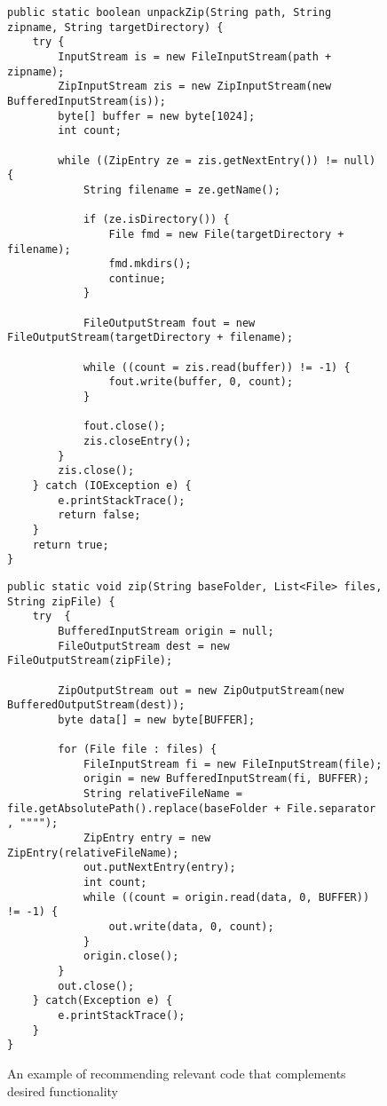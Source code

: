 \begin{figure*}[!t]
\begin{minipage}[t]{0.5\linewidth}
\begin{lstlisting}[style=MyJavaSmallStyle, caption={Query code: unpacking a zip file}, label={lst:mot-query}]
public static boolean unpackZip(String path, String zipname, String targetDirectory) {
	try {
		InputStream is = new FileInputStream(path + zipname);
		ZipInputStream zis = new ZipInputStream(new BufferedInputStream(is));
		byte[] buffer = new byte[1024];
		int count;

		while ((ZipEntry ze = zis.getNextEntry()) != null) {
			String filename = ze.getName();

			if (ze.isDirectory()) {
				File fmd = new File(targetDirectory + filename);
				fmd.mkdirs();
				continue;
			}

			FileOutputStream fout = new FileOutputStream(targetDirectory + filename);

			while ((count = zis.read(buffer)) != -1) {
				fout.write(buffer, 0, count);
			}

			fout.close();
			zis.closeEntry();
		}
		zis.close();
	} catch (IOException e) {
		e.printStackTrace();
		return false;
	}
	return true;
}
\end{lstlisting}
\end{minipage}
%
\begin{minipage}[t]{0.5\linewidth}
\begin{lstlisting}[style=MyJavaSmallStyle, caption={Recommended related code: zipping a file}, label={lst:mot-related}]
public static void zip(String baseFolder, List<File> files, String zipFile) {
	try  {
		BufferedInputStream origin = null;
		FileOutputStream dest = new FileOutputStream(zipFile);

		ZipOutputStream out = new ZipOutputStream(new BufferedOutputStream(dest));
		byte data[] = new byte[BUFFER];

		for (File file : files) {
			FileInputStream fi = new FileInputStream(file);
			origin = new BufferedInputStream(fi, BUFFER);
			String relativeFileName = file.getAbsolutePath().replace(baseFolder + File.separator , """");
			ZipEntry entry = new ZipEntry(relativeFileName);
			out.putNextEntry(entry);
			int count;
			while ((count = origin.read(data, 0, BUFFER)) != -1) {
				out.write(data, 0, count);
			}
			origin.close();
		}
		out.close();
	} catch(Exception e) {
		e.printStackTrace();
	}
}
\end{lstlisting}
\end{minipage}
\caption{An example of recommending relevant code that complements desired functionality}
\label{fig:example}
\end{figure*}